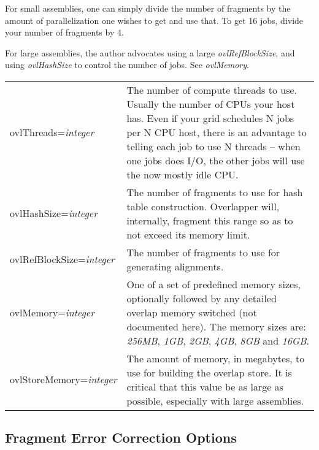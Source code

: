\documentclass[twoside,11pt]{article}
\begin{document}
For small assemblies, one can simply divide the number of fragments by
the amount of parallelization one wishes to get and use that.  To get
16 jobs, divide your number of fragments by 4.

For large assemblies, the author advocates using a large {\it
ovlRefBlockSize}, and using {\it ovlHashSize} to control the number of
jobs.  See {\it ovlMemory}.

\begin{tabular}{lp{4.0in}}
ovlThreads={\it integer} &
The number of compute threads to use.  Usually the number of CPUs your
host has.  Even if your grid schedules N jobs per N CPU host, there is
an advantage to telling each job to use N threads -- when one jobs
does I/O, the other jobs will use the now mostly idle CPU.
\\

ovlHashSize={\it integer} &
The number of fragments to use for hash table construction.  Overlapper will, internally,
fragment this range so as to not exceed its memory limit.
\\

ovlRefBlockSize={\it integer} &
The number of fragments to use for generating alignments.
\\

ovlMemory={\it integer} &
One of a set of predefined memory sizes, optionally followed by any
detailed overlap memory switched (not documented here).  The memory sizes are:
{\it 256MB},
{\it 1GB},
{\it 2GB},
{\it 4GB},
{\it 8GB} and
{\it 16GB}.
\\

ovlStoreMemory={\it integer} &
The amount of memory, in megabytes, to use for building the overlap store.  It is critical
that this value be as large as possible, especially with large assemblies.
\\
\end{tabular}



\subsection{Fragment Error Correction Options}
\end{document}
